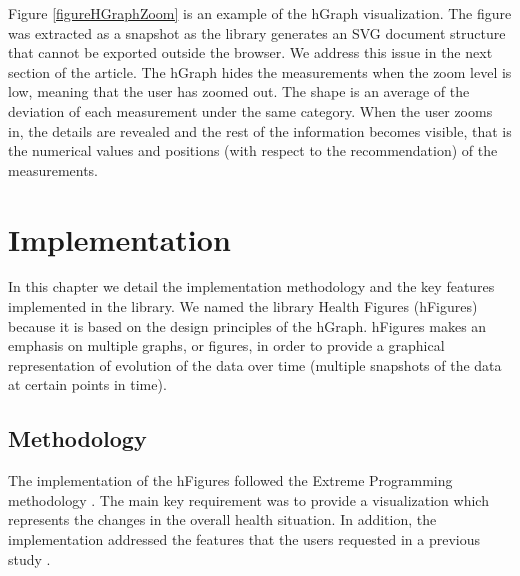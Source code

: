 \documentclass[twocolumn]{bmcart}%
\begin{document}



Figure \ref{figureHGraphZoom} is an example of the hGraph visualization. The figure was extracted as a snapshot as the library generates an SVG document structure that cannot be exported outside the browser. We address this issue in the next section of the article. The hGraph hides the measurements when the zoom level is low, meaning that the user has zoomed out. The shape is an average of the deviation of each measurement under the same category. When the user zooms in, the details are revealed and the rest of the information becomes visible, that is the numerical values and positions (with respect to the recommendation) of the measurements.

\section*{Implementation} 

In this chapter we detail the implementation methodology and the key features implemented in the library. We named the library Health Figures (hFigures) because it is based on the design principles of the hGraph. hFigures makes an emphasis on multiple graphs, or figures, in order to provide a graphical representation of evolution of the data over time (multiple snapshots of the data at certain points in time).

\subsection*{Methodology}

The implementation of the hFigures followed the Extreme Programming methodology \cite{roebuck2012agile, beck2000extreme}. The main key requirement was to provide a visualization which represents the changes in the overall health situation. In addition, the implementation addressed the features that the users requested in a previous study \citep{EMBCLedNiem}.
\end{document}
